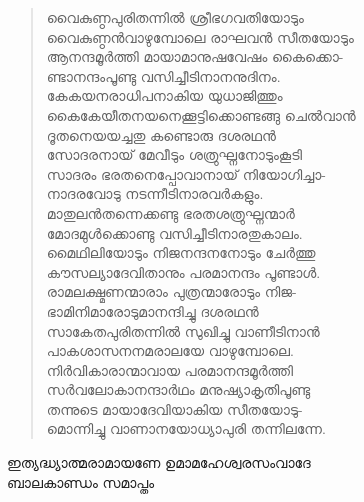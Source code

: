 \begin{verse}
വൈകുണ്ഠപുരിതന്നില്‍ ശ്രീഭഗവതിയോടും\\
വൈകുണ്ഠന്‍വാഴുമ്പോലെ രാഘവന്‍ സീതയോടും\\
ആനന്ദമൂര്‍ത്തി മായാമാനുഷവേഷം കൈക്കൊ-\\
ണ്ടാനന്ദംപൂണ്ടു വസിച്ചീടിനാനനുദിനം.\\
കേകയനരാധിപനാകിയ യുധാജിത്തും\\
കൈകേയീതനയനെക്കൂട്ടിക്കൊണ്ടങ്ങു ചെല്‍വാന്‍\\
ദൂതനെയയച്ചതു കണ്ടൊരു ദശരഥന്‍\\
സോദരനായ് മേവീടും ശത്രുഘ്നനോടുംകൂടി\\
സാദരം ഭരതനെപ്പോവാനായ് നിയോഗിച്ചാ-\\
നാദരവോടു നടന്നീടിനാരവര്‍കളും.\\
മാതുലന്‍തന്നെക്കണ്ടു ഭരതശത്രുഘ്നന്മാര്‍\\
മോദമുള്‍ക്കൊണ്ടു വസിച്ചീടിനാരതുകാലം.\\
മൈഥിലിയോടും നിജനന്ദനനോടും ചേര്‍ത്തു\\
കൗസല്യാദേവിതാനും പരമാനന്ദം പൂണ്ടാള്‍.\\
രാമലക്ഷ്മണന്മാരാം പുത്രന്മാരോടും നിജ-\\
ഭാമിനിമാരോടുമാനന്ദിച്ചു ദശരഥന്‍\\
സാകേതപുരിതന്നില്‍ സുഖിച്ചു വാണീടിനാന്‍\\
പാകശാസനനമരാലയേ വാഴുമ്പോലെ.\\
നിര്‍വികാരാന്മാവായ പരമാനന്ദമൂര്‍ത്തി\\
സര്‍വലോകാനന്ദാര്‍ഥം മനുഷ്യാകൃതിപൂണ്ടു\\
തന്നുടെ മായാദേവിയാകിയ സീതയോടു-\\
മൊന്നിച്ചു വാണാനയോധ്യാപുരി തന്നിലന്നേ.
\end{verse}

\begin{center}
ഇത്യദ്ധ്യാത്മരാമായണേ ഉമാമഹേശ്വരസംവാദേ\\
ബാലകാണ്ഡം സമാപ്തം
\end{center}
		
